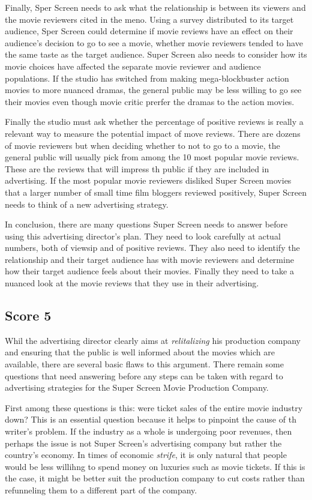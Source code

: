 Finally, Sper Screen needs to ask what the relationship is between its viewers and the movie reviewers cited in the meno.
Using a survey distributed to its target audience, Sper Screen could determine if movie reviews have an effect on their audience's decision to go to see a movie, whether movie reviewers tended to have the same taste as the target audience.
Super Screen also needs to consider how its movie choices have affected the separate movie reviewer and audience populations.
If the studio has switched from making mega-blockbuster action movies to more nuanced dramas, the general public may be less willing to go see their movies even though movie critic prerfer the dramas to the action movies.

Finally the studio must ask whether the percentage of positive reviews is really a relevant way to measure the potential impact of move reviews.
There are dozens of movie reviewers but when deciding whether to not to go to a movie, the general public will usually pick from among the 10 most popular movie reviews.
These are the reviews that will impress th public if they are included in advertising.
If the most popular movie reviewers disliked Super Screen movies that a larger number of small time film bloggers reviewed positively, Super Screen needs to think of a new advertising strategy.

In conclusion, there are many questions Super Screen needs to answer before using this advertising director's plan.
They need to look carefully at actual numbers, both of viewsip and of positive reviews.
They also need to identify the relationship and their target audience has with movie reviewers and determine how their target audience feels about their movies.
Finally they need to take a nuanced look at the movie reviews that they use in their advertising.


\subsection{Score 5}
Whil the advertising director clearly aims at \emph{relitalizing} his production company and ensuring that the public is well informed about the movies which are available, there are several basic flaws to this argument.
There remain some questions that need answering before any steps can be taken with regard to advertising strategies for the Super Screen Movie Production Company.

First among these questions is this: were ticket sales of the entire movie industry down?
This is an essential question because it helps to pinpoint the cause of th writer's problem.
If the industry as a whole is undergoing poor revenues, then perhaps the issue is not Super Screen's advertising company but rather the country's economy.
In times of economic \emph{strife}, it is only natural that people would be less willihng to spend money on luxuries such as movie tickets.
If this is the case, it might be better suit the production company to cut costs rather than refunneling them to a different part of the company.

